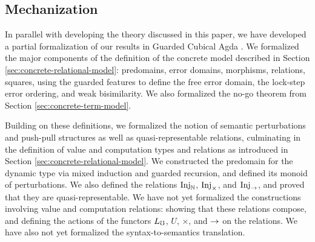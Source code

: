 
\subsection{Mechanization}\label{sec:mechanization}
In parallel with developing the theory discussed in this paper, we have
developed a partial formalization of our results in Guarded Cubical Agda
\cite{veltri-vezzosi2020}.
%
We formalized the major components of the definition of the concrete model
described in Section \ref{sec:concrete-relational-model}: predomains, error
domains, morphisms, relations, squares, using the guarded
features to define the free error domain, the lock-step error ordering, and weak
bisimilarity. We also formalized the no-go theorem from Section
\ref{sec:concrete-term-model}.

Building on these definitions, we formalized the notion of semantic
perturbations and push-pull structures as well as quasi-representable relations,
culminating in the definition of value and computation types and relations as
introduced in Section \ref{sec:concrete-relational-model}.
%
%
We constructed the predomain for the dynamic type via mixed induction and
guarded recursion, and defined its monoid of perturbations. We also defined the
relations $\text{Inj}_\mathbb{N}$, $\text{Inj}_\times$, and $\text{Inj}_\to$, and proved that they are
quasi-representable.
%
We have not yet formalized the constructions involving value and computation
relations: showing that these relations compose, and defining the actions of the
functors $L_\mho$, $U$, $\times$, and $\to$ on the relations. We have also not yet
formalized the syntax-to-semantics translation.



